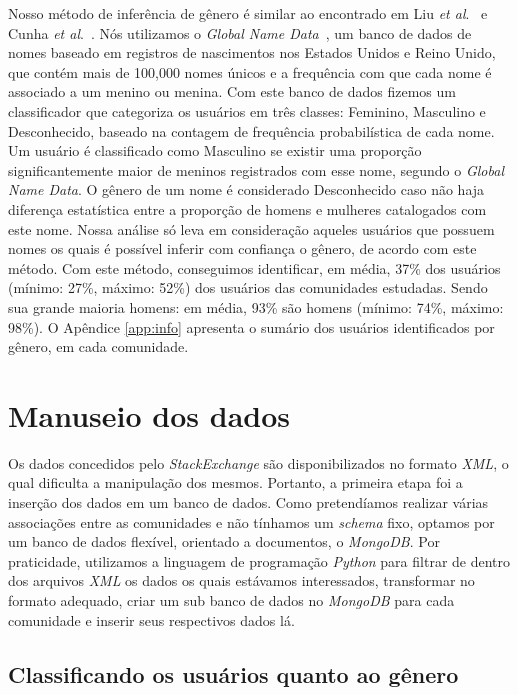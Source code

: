 Nosso método de inferência de gênero é similar ao encontrado em Liu \textit{et al}.~\cite{liu2013s} e Cunha \textit{et al}.~\cite{cunha2014he}. Nós utilizamos o \emph{Global Name Data}~\cite{Hyland:2013:Online}, um banco de dados de nomes baseado em registros de nascimentos nos Estados Unidos e Reino Unido, que contém mais de 100,000 nomes únicos e a frequência com que cada nome é associado a um menino ou menina. Com este banco de dados fizemos um classificador que categoriza os usuários em três classes: Feminino, Masculino e Desconhecido, baseado na contagem de frequência probabilística de cada nome. Um usuário é classificado como Masculino se existir uma proporção significantemente maior de meninos registrados com esse nome, segundo o \emph{Global Name Data}. O gênero de um nome é considerado Desconhecido caso não haja diferença estatística entre a proporção de homens e mulheres catalogados com este nome. Nossa análise só leva em consideração aqueles usuários que possuem nomes os quais é possível inferir com confiança o gênero, de acordo com este método. Com este método, conseguimos identificar, em média, 37\% dos usuários (mínimo: 27\%, máximo: 52\%) dos usuários das comunidades estudadas. Sendo sua grande maioria homens: em média, 93\% são homens (mínimo: 74\%, máximo: 98\%). O Apêndice \ref{app:info} apresenta o sumário dos usuários identificados por gênero, em cada comunidade.

\section{Manuseio dos dados}


Os dados concedidos pelo \emph{StackExchange} são disponibilizados no formato \emph{XML}, o qual dificulta a manipulação dos mesmos. Portanto, a primeira etapa foi a inserção dos dados em um banco de dados. Como pretendíamos realizar várias associações entre as comunidades e não tínhamos um \emph{schema} fixo, optamos por um banco de dados flexível, orientado a documentos, o \emph{MongoDB}. Por praticidade, utilizamos a linguagem de programação \emph{Python} para filtrar de dentro dos arquivos \emph{XML} os dados os quais estávamos interessados, transformar no formato adequado, criar um sub banco de dados no \emph{MongoDB} para cada comunidade e inserir seus respectivos dados lá.



\subsection{Classificando os usuários quanto ao gênero}

